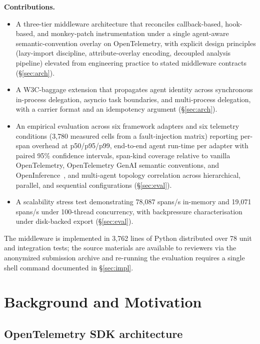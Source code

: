 \documentclass[sigconf,review,anonymous,9pt]{acmart}
\begin{document}
\textbf{Contributions.}
\begin{itemize}[leftmargin=*,nosep]
  \item A three-tier middleware architecture that reconciles
    callback-based, hook-based, and monkey-patch instrumentation under
    a single agent-aware semantic-convention overlay on OpenTelemetry,
    with explicit design principles (lazy-import discipline,
    attribute-overlay encoding, decoupled analysis pipeline) elevated
    from engineering practice to stated middleware contracts
    (\S\ref{sec:arch}).
  \item A W3C-baggage extension that propagates agent identity
    across synchronous in-process delegation, asyncio task
    boundaries, and multi-process delegation, with a carrier
    format and an idempotency argument (\S\ref{sec:arch}).
  \item An empirical evaluation across six framework adapters and six
    telemetry conditions (3{,}780 measured cells from a
    fault-injection matrix) reporting per-span overhead at p50/p95/p99,
    end-to-end agent run-time per adapter with paired 95\%
    confidence intervals, span-kind coverage relative
    to vanilla OpenTelemetry, OpenTelemetry GenAI semantic
    conventions, and OpenInference~\cite{openinference}, and
    multi-agent topology correlation across hierarchical, parallel,
    and sequential configurations (\S\ref{sec:eval}).
  \item A scalability stress test demonstrating 78{,}087 spans/s
    in-memory and 19{,}071 spans/s under 100-thread concurrency, with
    backpressure characterisation under disk-backed export
    (\S\ref{sec:eval}).
\end{itemize}

The middleware is implemented in 3{,}762 lines of Python distributed
over 78 unit and integration tests; the source materials are available
to reviewers via the anonymized submission archive and re-running the
evaluation requires a single shell command documented in
\S\ref{sec:impl}.

\section{Background and Motivation}
\label{sec:bg}

\subsection{OpenTelemetry SDK architecture}
\end{document}
